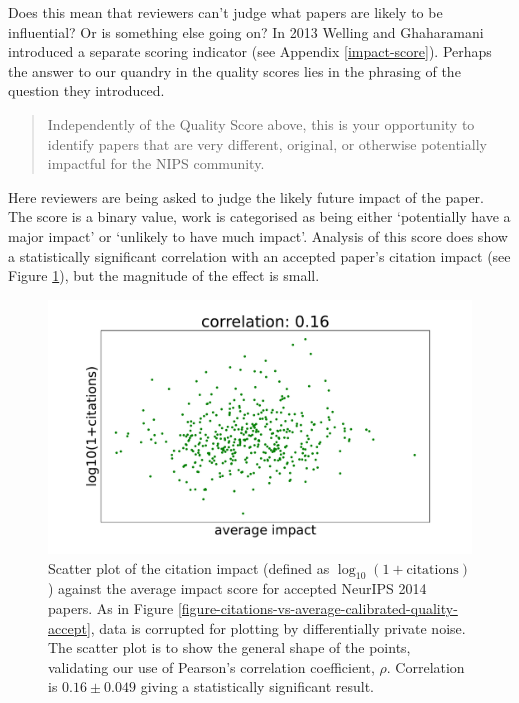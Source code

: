 \documentclass[twoside]{article}
\begin{document}
Does this mean that reviewers can't judge what papers are likely to be influential? Or is something else going on? In 2013 Welling and Ghaharamani introduced a separate scoring indicator (see Appendix \ref{impact-score}). Perhaps the answer to our quandry in the quality scores lies in the phrasing of the question they introduced.
\begin{quote}
  Independently of the Quality Score above, this is your opportunity to
identify papers that are very different, original, or otherwise
potentially impactful for the NIPS community.
\end{quote}

Here reviewers are being asked to judge the likely future impact of the paper. The score is a binary value, work is categorised as being either `potentially have a major impact' or `unlikely to have much impact'. Analysis of this score does show a statistically significant correlation with an accepted paper's citation impact (see Figure \ref{figure-citations-vs-average-impact-accept}), but the magnitude of the effect is small. 

\begin{figure}[htb]
  \begin{center}
    \includegraphics[width=0.9\columnwidth]{diagrams/neurips/citations-vs-average-impact-accept.pdf}
  \end{center}
  \caption{Scatter plot of the citation impact (defined as $\log_{10}(1+\text{citations})$) against the average impact score for accepted NeurIPS 2014 papers. As in Figure \ref{figure-citations-vs-average-calibrated-quality-accept}, data  is corrupted for plotting by differentially private noise. The scatter plot is to show the general shape of the points, validating our use of Pearson's correlation coefficient, $\rho$. Correlation is $0.16 \pm 0.049$ giving a statistically significant result.}
  \label{figure-citations-vs-average-impact-accept}
\end{figure}
\end{document}
